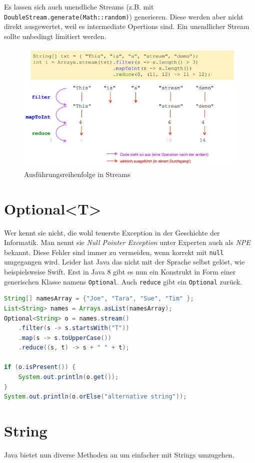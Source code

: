 Es lassen sich auch unendliche Streams (z.B. mit \verb|DoubleStream.generate(Math::random)|) generieren. Diese werden aber nicht direkt ausgewertet, weil es intermediate Opertions sind. Ein unendlicher Stream sollte unbedingt limitiert werden.

\begin{figure}[h!]
\centering
\includegraphics[width=0.6\linewidth]{fig/java-stream-executions}
\caption{Ausführungsreihenfolge in Streams}
\label{fig:java-stream-executions}
\end{figure}

\newpage

\section{Optional<T>}
Wer kennt sie nicht, die wohl teuerste Exception in der Geschichte der Informatik. Man nennt sie \emph{Null Pointer Exception} unter Experten auch als \emph{NPE} bekannt. Diese Fehler sind immer zu vermeiden, wenn korrekt mit \verb|null| umgegangen wird. Leider hat Java das nicht mit der Sprache selbst gelöst, wie beispielsweise Swift. Erst in Java 8 gibt es nun ein Konstrukt in Form einer generischen Klasse namens \verb|Optional|. Auch \verb|reduce| gibt ein \verb|Optional| zurück.

\begin{lstlisting}[language=Java, caption=Optional]
String[] namesArray = {"Joe", "Tara", "Sue", "Tim" };
List<String> names = Arrays.asList(namesArray);
Optional<String> o = names.stream()
	.filter(s -> s.startsWith("T"))
	.map(s -> s.toUpperCase())
	.reduce((s, t) -> s + " " + t);
	
if (o.isPresent()) {
	System.out.println(o.get());
}
System.out.println(o.orElse("alternative string"));
\end{lstlisting}

\section{String}
Java bietet nun diverse Methoden an um einfacher mit Strings umzugehen.


